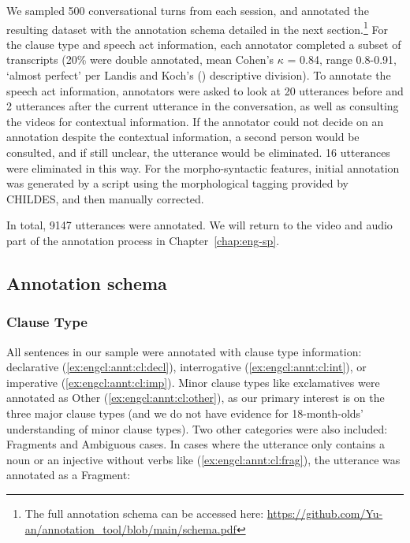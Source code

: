 We sampled 500 conversational turns from each session, and annotated the resulting dataset with the annotation schema detailed in the next section.\footnote{The full annotation schema can be accessed here: \url{https://github.com/Yu-an/annotation_tool/blob/main/schema.pdf}} For the clause type and speech act information, each annotator completed a subset of transcripts (20\% were double annotated, mean Cohen's $\kappa$ = 0.84, range 0.8-0.91, `almost perfect’ per Landis and Koch's (\cite*{landis1977iaa}) descriptive division). To annotate the speech act information, annotators were asked to look at 20 utterances before and 2 utterances after the current utterance in the conversation, as well as consulting the videos for contextual information. If the annotator could not decide on an annotation despite the contextual information, a second person would be consulted, and if still unclear, the utterance would be eliminated. 16 utterances were eliminated in this way. For the morpho-syntactic features, initial annotation was generated by a script using the morphological tagging provided by CHILDES, and then manually corrected. 

In total, 9147 utterances were annotated. We will return to the video and audio part of the annotation process in Chapter~\ref{chap:eng-sp}.




\subsection{Annotation schema}
\label{sec:engcl:corpus:schema}

\subsubsection{Clause Type}

All sentences in our sample were annotated with clause type information: declarative (\ref{ex:engcl:annt:cl:decl}), interrogative (\ref{ex:engcl:annt:cl:int}), or imperative (\ref{ex:engcl:annt:cl:imp}). Minor clause types like exclamatives were annotated as Other (\ref{ex:engcl:annt:cl:other}), as our primary interest is on the three major clause types (and we do not have evidence for 18-month-olds' understanding of minor clause types). Two other categories were also included: Fragments and Ambiguous cases. In cases where the utterance only contains a noun or an injective without verbs like (\ref{ex:engcl:annt:cl:frag}), the utterance was annotated as a Fragment: 

